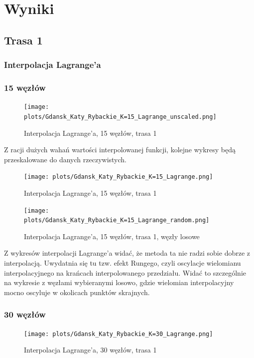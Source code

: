 \documentclass{article}
\begin{document}
\section{Wyniki}

\subsection{Trasa 1}
\subsubsection{Interpolacja Lagrange'a}
\subsubsection*{\hfil 15 węzłów \hfil }

\begin{figure}[H]
    \centering
    \texttt{[image: plots/Gdansk\_Katy\_Rybackie\_K=15\_Lagrange\_unscaled.png]}
    \caption{Interpolacja Lagrange'a, 15 węzłów, trasa 1}
\end{figure}

Z racji dużych wahań wartości interpolowanej funkcji, kolejne wykresy będą przeskalowane
do danych rzeczywistych.


\begin{figure}[H]
    \centering
    \texttt{[image: plots/Gdansk\_Katy\_Rybackie\_K=15\_Lagrange.png]}
    \caption{Interpolacja Lagrange'a, 15 węzłów, trasa 1}
\end{figure}

\begin{figure}[H]
    \centering
    \texttt{[image: plots/Gdansk\_Katy\_Rybackie\_K=15\_Lagrange\_random.png]}
    \caption{Interpolacja Lagrange'a, 15 węzłów, trasa 1, węzły losowe}
\end{figure}

Z wykresów interpolacji Lagrange'a widać, że metoda ta nie radzi sobie dobrze z interpolacją.
Uwydatnia się tu tzw. efekt Rungego, czyli oscylacje wielomianu interpolacyjnego na krańcach interpolowanego
przedziału. Widać to szczególnie na wykresie z węzłami wybieranymi losowo, gdzie
wielomian interpolacyjny mocno oscyluje w okolicach punktów skrajnych.

\subsubsection*{\hfil 30 węzłów \hfil }
\begin{figure}[H]
    \centering
    \texttt{[image: plots/Gdansk\_Katy\_Rybackie\_K=30\_Lagrange.png]}
    \caption{Interpolacja Lagrange'a, 30 węzłów, trasa 1}
\end{figure}
\end{document}
